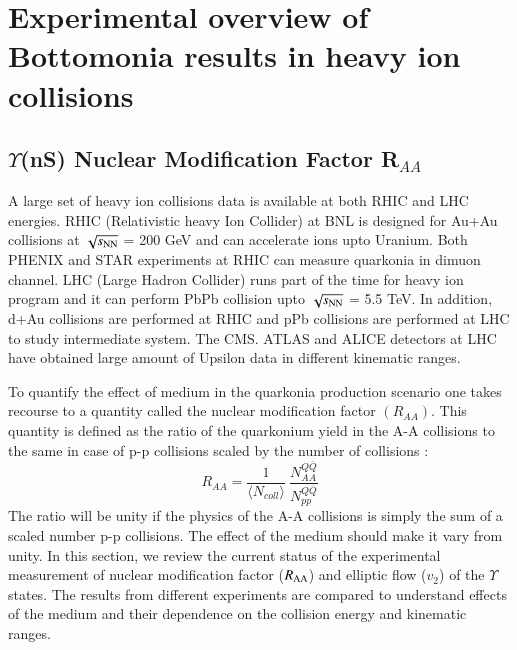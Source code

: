 \section{Experimental overview of Bottomonia results in heavy ion collisions}



\subsection{$\Upsilon$(nS) Nuclear Modification Factor R$_{AA}$}
A large set of heavy ion collisions data is available at both RHIC and LHC energies.
RHIC (Relativistic heavy Ion Collider) at BNL is designed for Au+Au collisions
at $\sqrt{s_{\rm NN}}$ = 200 GeV and can accelerate ions upto Uranium. Both PHENIX and
STAR experiments at RHIC can measure quarkonia in dimuon channel. 
LHC (Large Hadron Collider) runs part of the time for heavy ion program and it
can perform PbPb collision upto $\sqrt{s_{\rm NN}}$ = 5.5 TeV. In addition, d+Au collisions
are performed at RHIC and pPb collisions are performed at LHC to study
intermediate system. The CMS. ATLAS and ALICE detectors at LHC have obtained large
amount of Upsilon data in different kinematic ranges.

To quantify the effect of medium in the quarkonia production scenario one takes
recourse to a quantity called the nuclear modification factor $(R_{AA})$. This quantity
is defined as the ratio of the quarkonium yield in the A-A collisions to the same
in case of p-p collisions scaled by the number of collisions : 
 \begin{equation}
 R_{AA} = \frac{1}{\langle N_{coll} \rangle} \ \frac {N^{Q{\bar Q}}_{AA}} {N^{Q{\bar Q}}_{pp}} 
 \end{equation}
 The ratio will be unity if the physics of the A-A collisions is simply the sum of
 a scaled number p-p collisions. The effect of the medium should make it vary from unity. 
In this section, we review the current status of the experimental measurement
of nuclear modification factor ($R_{\rm AA}$) and elliptic flow ($v_{2}$) of the
$\Upsilon$ states. The results from different experiments are compared to
understand effects of the medium and their dependence on the collision energy
and kinematic ranges. 



